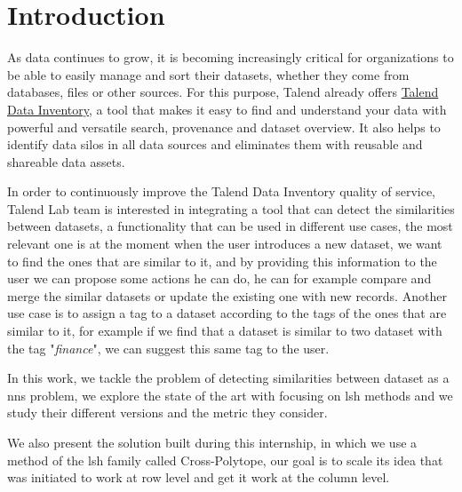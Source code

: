 \chapter*{Introduction}

As data continues to grow, it is becoming increasingly critical for
organizations to be able to easily manage and sort their datasets, whether they
come from databases, files or other sources. For this purpose, Talend already
offers \href{https://www.talend.com/products/data-inventory/}{Talend Data
Inventory}, a tool that makes it easy to find and understand your data with
powerful and versatile search, provenance and dataset overview. It also helps to
identify data silos in all data sources and eliminates them with reusable and
shareable data assets.

In order to continuously improve the Talend Data Inventory quality of service,
Talend Lab team is interested in integrating a tool that can detect the
similarities between datasets, a functionality that can be used in different use
cases, the most relevant one is at the moment when the user introduces a new
dataset, we want to find the ones that are similar to it, and by providing this
information to the user we can propose some actions he can do, he can for
example compare and merge the similar datasets or update the existing one with
new records. Another use case is to assign a tag to a dataset according to the
tags of the ones that are similar to it, for example if we find that a dataset
is similar to two dataset with the tag "\textit{finance}", we can suggest this
same tag to the user.

In this work, we tackle the problem of detecting similarities between dataset as
a \Acrfull{nns} problem, we explore the state of the art with focusing on
\Acrfull{lsh} methods and we study their different versions and the metric they
consider.

We also present the solution built during this internship, in which we use a
method of the \acrshort{lsh} family called Cross-Polytope, our goal is to scale
its idea that was initiated to work at row level and get it work at the column
level.



